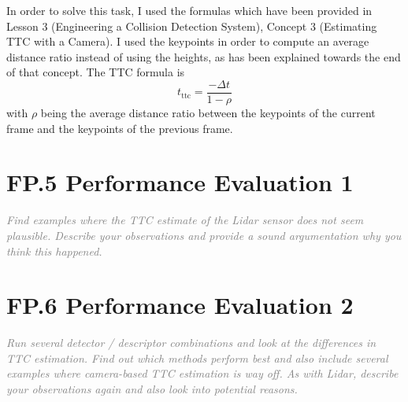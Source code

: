 \documentclass[a4paper]{scrartcl}
\begin{document}
In order to solve this task, I used the formulas
which have been provided in Lesson 3
(Engineering a Collision Detection System),
Concept 3 (Estimating TTC with a Camera).
I used the keypoints in order to compute an
average distance ratio instead of using the heights,
as has been explained towards the end of that concept.
The TTC formula is
\begin{equation}
	t_\text{ttc} = \frac{- \Delta t}{1 - \rho}
\end{equation}
with $\rho$ being the average distance ratio
between the keypoints of the current frame
and the keypoints of the previous frame.

\section*{FP.5 Performance Evaluation 1}
\textcolor{gray}{\textit{Find examples where the TTC estimate of the Lidar sensor does not seem plausible. Describe your observations and provide a sound argumentation why you think this happened.}}

\section*{FP.6 Performance Evaluation 2}
\textcolor{gray}{\textit{Run several detector / descriptor combinations and look at the differences in TTC estimation. Find out which methods perform best and also include several examples where camera-based TTC estimation is way off. As with Lidar, describe your observations again and also look into potential reasons.}}
\end{document}

